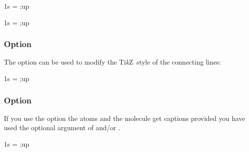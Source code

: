 \documentclass[load-preamble+]{cnltx-doc}
\newcommand*\TikZ{Ti\textit{k}Z}
\begin{document}
\begin{example}
  \begin{MOdiagram}[up-el-pos=.333,down-el-pos=.667]
     { 1s = {;up} }
  \end{MOdiagram}
\end{example}

\begin{example}
  \begin{MOdiagram}[up-el-pos=.7,down-el-pos=.3]
     { 1s = {;up} }
  \end{MOdiagram}
\end{example}

\subsubsection{Option }\label{option:lines}
The option  can be used to modify the \TikZ\ style of the
connecting lines:
\begin{example}
  \begin{MOdiagram}[lines={gray,thin}]
     { 1s = {;up} }
  \end{MOdiagram}
\end{example}

\subsubsection{Option }\label{option:names}
If you use the option  the atoms and the molecule get captions
provided you have used the optional  argument of  and/or
.
\begin{example}
  \begin{MOdiagram}[names]
     { 1s = {;up} }
  \end{MOdiagram}
\end{example}
\end{document}
